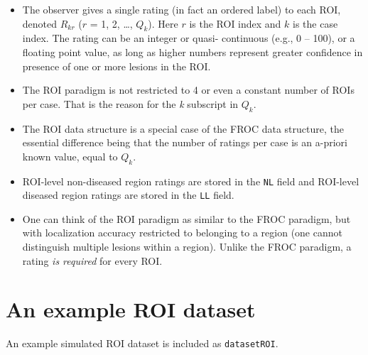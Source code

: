 \documentclass[
]{book}
\begin{document}
\begin{itemize}
\item
  The observer gives a single rating (in fact an ordered label) to each ROI, denoted \({R_{kr}}\) (\(r\) = 1, 2, \ldots, \({Q_k}\)). Here \(r\) is the ROI index and \(k\) is the case index. The rating can be an integer or quasi- continuous (e.g., 0 -- 100), or a floating point value, as long as higher numbers represent greater confidence in presence of one or more lesions in the ROI.
\item
  The ROI paradigm is not restricted to 4 or even a constant number of ROIs per case. That is the reason for the \emph{k} subscript in \({Q_k}\).
\item
  The ROI data structure is a special case of the FROC data structure, the essential difference being that the number of ratings per case is an a-priori known value, equal to \({Q_{k}}\).
\item
  ROI-level non-diseased region ratings are stored in the \texttt{NL} field and ROI-level diseased region ratings are stored in the \texttt{LL} field.\\
\item
  One can think of the ROI paradigm as similar to the FROC paradigm, but with localization accuracy restricted to belonging to a region (one cannot distinguish multiple lesions within a region). Unlike the FROC paradigm, a rating \emph{is required} for every ROI.
\end{itemize}

\hypertarget{an-example-roi-dataset}{%
\section{An example ROI dataset}\label{an-example-roi-dataset}}

An example simulated ROI dataset is included as \texttt{datasetROI}.
\end{document}
